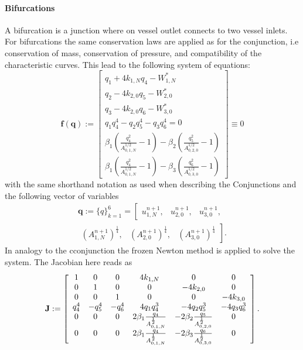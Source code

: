 \documentclass[a4paper, oneside]{discothesis}
\begin{document}
					\paragraph{Bifurcations} \label{par:bifurcations}
					A bifurcation is a junction where on vessel outlet connects to two vessel inlets.
					For bifurcations the same conservation laws are applied as for the conjunction, i.e conservation of mass, conservation of pressure, and compatibility of the characteristic curves.
					This lead to the following system of equations:
					\begin{equation}
						\mathbf{f}(\mathbf{q}):=\left[\begin{array}{c}
								q_{1}+4 k_{1,N} q_{4}-W_{1,N}^* \\
								q_{2}-4 k_{2,0} q_{5}-W_{2,0}^* \\
								q_{3}-4 k_{2,0} q_{6}-W_{3,0}^* \\
								q_{1} q_{4}^4-q_{2} q_{5}^4-q_{3} q_{6}^4=0 \\
								\beta_1\left(\frac{q_{4}^2}{A_{0,1,N}^{1 / 2}}-1\right)-\beta_2\left(\frac{q_{5}^2}{A_{0,2,0}^{1 / 2}}-1\right) \\
								\beta_1\left(\frac{q_{4}^2}{A_{0,1,N}^{1 / 2}}-1\right)-\beta_3\left(\frac{q_{6}^2}{A_{0,3,0}^{1 / 2}}-1\right) 
						\end{array}\right] \equiv 0 \label{syseq_bif}
					\end{equation}
					with the same shorthand notation as used when describing the Conjunctions and the following vector of variables
					\begin{multline}
						\mathbf{q}:=\{q\}_{k=1}^6 = \left[
							\begin{array}{lll}
								u_{1,N}^{n+1}, & u_{2,0}^{n+1}, & u_{3,0}^{n+1},
						\end{array} \right. \\
						\left. \begin{array} {lll}    \left(A_{1,N}^{n+1}\right)^{\frac{1}{4}}, & \left(A_{2,0}^{n+1}\right)^{\frac{1}{4}}, & \left(A_{3,0}^{n+1}\right)^{\frac{1}{4}}
						\end{array}\right].
							\end{multline}
							In analogy to the cconjunction the frozen Newton method is applied to solve the system.
							The Jacobian here reads as
							\begin{equation}
								\mathbf{J}:=\left[\begin{array}{c c c c c c}
										1&0&0&4k_{1,N}&0&0\\
										0&1&0&0&-4k_{2,0}&0\\
										0&0&1&0&0&-4k_{3,0}\\
										q_{4}^4 & -q_{5}^4 & -q_{6}^4 & 4q_{1}q_{4}^3 & -4q_{2}q_{5}^3 & -4q_{3}q_{6}^3 \\
										0 & 0 & 0 & 2\beta_1\frac{q_{4}}{A_{0,1,N}^{\frac{1}{2}}} & -2\beta_2\frac{q_{5}}{A_{0,2,0}^{\frac{1}{2}}} & 0\\
										0 & 0 & 0 & 2\beta_1\frac{q_{4}}{A_{0,1,N}^{\frac{1}{2}}} & -2\beta_3\frac{q_{6}}{A_{0,3,0}^{\frac{1}{2}}} & 0\\
									\end{array} 
								\right].
							\end{equation}
\end{document}

